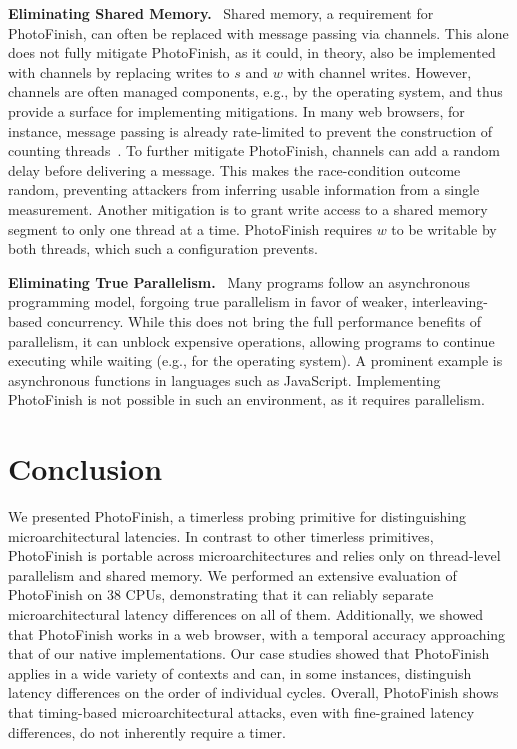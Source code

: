 \documentclass[letterpaper,twocolumn,10pt]{article} %
\newcommand{\paragrabf}[1]{\noindent \textbf{#1.}\ }
\newcommand{\AttackName}{PhotoFinish\xspace}
\newcommand{\PlatformCount}{38\xspace}
\begin{document}
\paragrabf{Eliminating Shared Memory}
Shared memory, a requirement for \AttackName, can often be replaced with message passing via channels.
This alone does not fully mitigate \AttackName, as it could, in theory, also be implemented with channels by replacing writes to $s$ and $w$ with channel writes.
However, channels are often managed components, e.g., by the operating system, and thus provide a surface for implementing mitigations.
In many web browsers, for instance, message passing is already rate-limited to prevent the construction of counting threads~\cite{Kohlbrenner2016,Schwarz2017Timers}.
To further mitigate \AttackName, channels can add a random delay before delivering a message.
This makes the race-condition outcome random, preventing attackers from inferring usable information from a single measurement.
Another mitigation is to grant write access to a shared memory segment to only one thread at a time.
\AttackName requires $w$ to be writable by both threads, which such a configuration prevents.

\paragrabf{Eliminating True Parallelism}
Many programs follow an asynchronous programming model, forgoing true parallelism in favor of weaker, interleaving-based concurrency.
While this does not bring the full performance benefits of parallelism, it can unblock expensive operations, allowing programs to continue executing while waiting (e.g., for the operating system).
A prominent example is asynchronous functions in languages such as JavaScript.
Implementing \AttackName is not possible in such an environment, as it requires parallelism.

\section{Conclusion}\label{sec:conclusion}
We presented \AttackName, a timerless probing primitive for distinguishing microarchitectural latencies.
In contrast to other timerless primitives, \AttackName is portable across microarchitectures and relies only on thread-level parallelism and shared memory.
We performed an extensive evaluation of \AttackName on \PlatformCount CPUs, demonstrating that it can reliably separate microarchitectural latency differences on all of them.
Additionally, we showed that \AttackName works in a web browser, with a temporal accuracy approaching that of our native implementations.
Our case studies showed that \AttackName applies in a wide variety of contexts and can, in some instances, distinguish latency differences on the order of individual cycles.
Overall, \AttackName shows that timing-based microarchitectural attacks, even with fine-grained latency differences, do not inherently require a timer.
\end{document}

